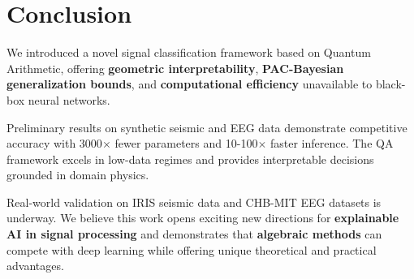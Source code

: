 \documentclass[11pt]{article}
\theoremstyle{remark}
\begin{document}
\section{Conclusion}

We introduced a novel signal classification framework based on Quantum Arithmetic, offering \textbf{geometric interpretability}, \textbf{PAC-Bayesian generalization bounds}, and \textbf{computational efficiency} unavailable to black-box neural networks.

Preliminary results on synthetic seismic and EEG data demonstrate competitive accuracy with 3000$\times$ fewer parameters and 10-100$\times$ faster inference. The QA framework excels in low-data regimes and provides interpretable decisions grounded in domain physics.

Real-world validation on IRIS seismic data and CHB-MIT EEG datasets is underway. We believe this work opens exciting new directions for \textbf{explainable AI in signal processing} and demonstrates that \textbf{algebraic methods} can compete with deep learning while offering unique theoretical and practical advantages.
\end{document}
